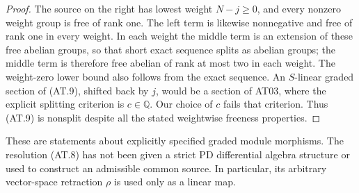 \begin{proof}
The source on the right has lowest weight $N-j\geq0$,
and every nonzero weight group is free of rank one.
The left term is likewise nonnegative and free of
rank one in every weight. In each weight the middle
term is an extension of these free abelian groups,
so that short exact sequence splits as abelian groups;
the middle term is therefore free abelian of rank at
most two in each weight. The weight-zero lower bound
also follows from the exact sequence. An $S$-linear
graded section of (AT.9), shifted back by $j$, would
be a section of AT03, where the explicit splitting
criterion is $c\in\mathbb Q$. Our choice of $c$ fails
that criterion. Thus (AT.9) is nonsplit despite all
the stated weightwise freeness properties.
\end{proof}

These are statements about explicitly specified graded
module morphisms. The resolution (AT.8) has not been
given a strict PD differential algebra structure or
used to construct an admissible common source. In
particular, its arbitrary vector-space retraction
$\rho$ is used only as a linear map.
